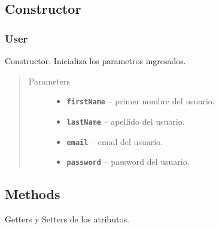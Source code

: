 \documentclass[letterpaper,10pt,english]{sphinxmanual}
\begin{document}
\subsection{Constructor}
\label{Model/User:constructor}

\subsubsection{User}
\label{Model/User:id1}

\begin{fulllineitems}
\label{Model/User:com.fiuba.tallerii.jobify.User.User(String, String, String, String)}
Constructor. Inicializa los parametros ingresados.
\begin{quote}\begin{description}
\item[{Parameters}] \leavevmode\begin{itemize}
\item {} 
\textbf{\texttt{firstName}} -- primer nombre del usuario.

\item {} 
\textbf{\texttt{lastName}} -- apellido del usuario.

\item {} 
\textbf{\texttt{email}} -- email del usuario.

\item {} 
\textbf{\texttt{password}} -- password del usuario.

\end{itemize}

\end{description}\end{quote}

\end{fulllineitems}



\subsection{Methods}
\label{Model/User:methods}
Getters y Setters de los atributos.
\end{document}
